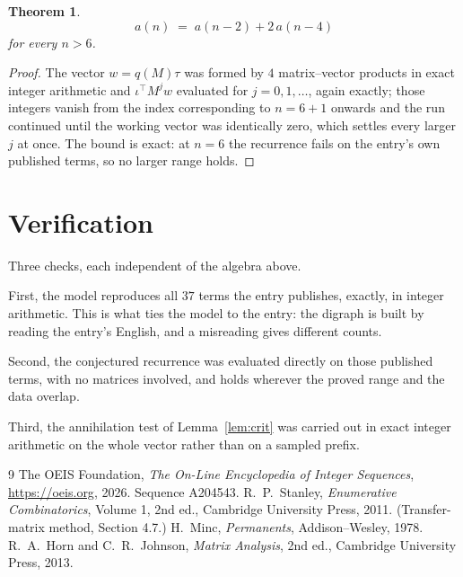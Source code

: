 \documentclass[11pt,a4paper]{article}
\theoremstyle{plain}
\newtheorem{theorem}{Theorem}
\theoremstyle{definition}
\begin{document}
\begin{theorem}
\[
a(n)\;=\;a(n-2) + 2\,a(n-4)
\]
for every $n>6$.
\end{theorem}

\begin{proof}
The vector $w=q(M)\tau$ was formed by $4$ matrix--vector products in exact integer
arithmetic and $\iota^{\!\top}M^{j}w$ evaluated for $j=0,1,\dots$, again exactly; those
integers vanish from the index corresponding to $n=6+1$ onwards and the run continued
until the working vector was identically zero, which settles every larger $j$ at once. The bound is exact: at $n=6$ the recurrence fails on the entry's own published terms, so no larger range holds.
\end{proof}

\section{Verification}

Three checks, each independent of the algebra above.

First, the model reproduces all $37$ terms the entry publishes, exactly, in integer
arithmetic. This is what ties the model to the entry: the digraph is built by reading the
entry's English, and a misreading gives different counts.

Second, the conjectured recurrence was evaluated directly on those published terms, with no
matrices involved, and holds wherever the proved range and the data overlap.

Third, the annihilation test of Lemma~\ref{lem:crit} was carried out in exact integer
arithmetic on the whole vector rather than on a sampled prefix.

\begin{thebibliography}{9}
 The OEIS Foundation, \emph{The On-Line Encyclopedia of Integer
Sequences}, \url{https://oeis.org}, 2026. Sequence A204543.
 R.~P.~Stanley, \emph{Enumerative Combinatorics}, Volume 1, 2nd ed.,
Cambridge University Press, 2011. (Transfer-matrix method, Section 4.7.)
 H.~Minc, \emph{Permanents}, Addison--Wesley, 1978.
 R.~A.~Horn and C.~R.~Johnson, \emph{Matrix Analysis}, 2nd ed., Cambridge
University Press, 2013.
\end{thebibliography}
\end{document}
